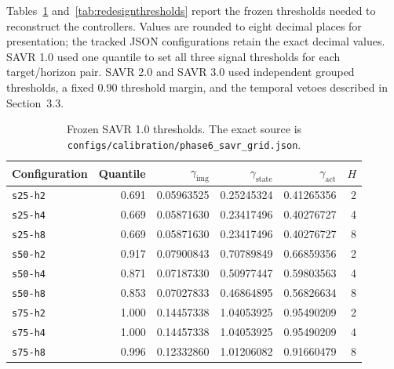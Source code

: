 \documentclass[11pt]{article}
\begin{document}
Tables~\ref{tab:savr1thresholds} and~\ref{tab:redesignthresholds} report the frozen thresholds needed to reconstruct the controllers. Values are rounded to eight decimal places for presentation; the tracked JSON configurations retain the exact decimal values. SAVR 1.0 used one quantile to set all three signal thresholds for each target/horizon pair. SAVR 2.0 and SAVR 3.0 used independent grouped thresholds, a fixed $0.90$ threshold margin, and the temporal vetoes described in Section~3.3.

\begin{table}[H]
\centering
\scriptsize
\caption{Frozen SAVR 1.0 thresholds. The exact source is \nolinkurl{configs/calibration/phase6_savr_grid.json}.}
\label{tab:savr1thresholds}
\begin{tabular}{lrrrrr}
\toprule
Configuration & Quantile & $\gamma_{\mathrm{img}}$ & $\gamma_{\mathrm{state}}$ & $\gamma_{\mathrm{act}}$ & $H$ \\
\midrule
\nolinkurl{s25-h2} & 0.691 & 0.05963525 & 0.25245324 & 0.41265356 & 2 \\
\nolinkurl{s25-h4} & 0.669 & 0.05871630 & 0.23417496 & 0.40276727 & 4 \\
\nolinkurl{s25-h8} & 0.669 & 0.05871630 & 0.23417496 & 0.40276727 & 8 \\
\nolinkurl{s50-h2} & 0.917 & 0.07900843 & 0.70789849 & 0.66859356 & 2 \\
\nolinkurl{s50-h4} & 0.871 & 0.07187330 & 0.50977447 & 0.59803563 & 4 \\
\nolinkurl{s50-h8} & 0.853 & 0.07027833 & 0.46864895 & 0.56826634 & 8 \\
\nolinkurl{s75-h2} & 1.000 & 0.14457338 & 1.04053925 & 0.95490209 & 2 \\
\nolinkurl{s75-h4} & 1.000 & 0.14457338 & 1.04053925 & 0.95490209 & 4 \\
\nolinkurl{s75-h8} & 0.996 & 0.12332860 & 1.01206082 & 0.91660479 & 8 \\
\bottomrule
\end{tabular}
\end{table}
\end{document}
